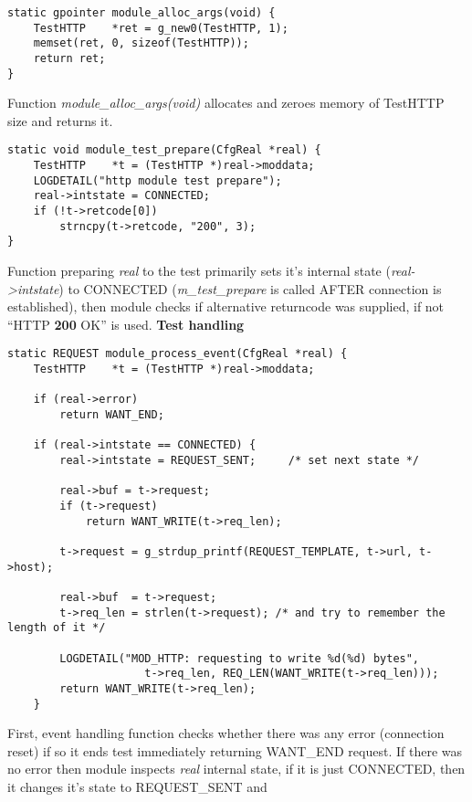 \documentclass[polish,12pt]{article}
\begin{document}
\begin{verbatim}
static gpointer module_alloc_args(void) {
    TestHTTP    *ret = g_new0(TestHTTP, 1);
    memset(ret, 0, sizeof(TestHTTP));
    return ret;
}
\end{verbatim}
Function \textit{module\_alloc\_args(void)} allocates and zeroes memory of TestHTTP
size and returns it.
\newline
\newline
\begin{verbatim}
static void module_test_prepare(CfgReal *real) {
    TestHTTP    *t = (TestHTTP *)real->moddata;
    LOGDETAIL("http module test prepare");
    real->intstate = CONNECTED;
    if (!t->retcode[0])
        strncpy(t->retcode, "200", 3);
}
\end{verbatim}
Function preparing \textit{real} to the test primarily sets it's internal state (\textit{real->intstate})
to CONNECTED (\textit{m\_test\_prepare} is called AFTER connection is established), then module
checks if alternative returncode was supplied, if not ``HTTP \textbf{200} OK'' is used.
\newpage
\large \textbf{Test handling}\newline
\normalsize
{\small
\begin{verbatim}
static REQUEST module_process_event(CfgReal *real) {
    TestHTTP    *t = (TestHTTP *)real->moddata;

    if (real->error)
        return WANT_END;

    if (real->intstate == CONNECTED) {
        real->intstate = REQUEST_SENT;     /* set next state */

        real->buf = t->request;
        if (t->request)
            return WANT_WRITE(t->req_len);

        t->request = g_strdup_printf(REQUEST_TEMPLATE, t->url, t->host);

        real->buf  = t->request;
        t->req_len = strlen(t->request); /* and try to remember the length of it */

        LOGDETAIL("MOD_HTTP: requesting to write %d(%d) bytes",
                     t->req_len, REQ_LEN(WANT_WRITE(t->req_len)));
        return WANT_WRITE(t->req_len);
    }
\end{verbatim}
}
First, event handling function checks whether there was any error (connection reset)
if so it ends test immediately returning WANT\_END request.
\newline
If there was no error then module inspects \textit{real} internal state,
if it is just CONNECTED, then it changes it's state to REQUEST\_SENT and
\end{document}
